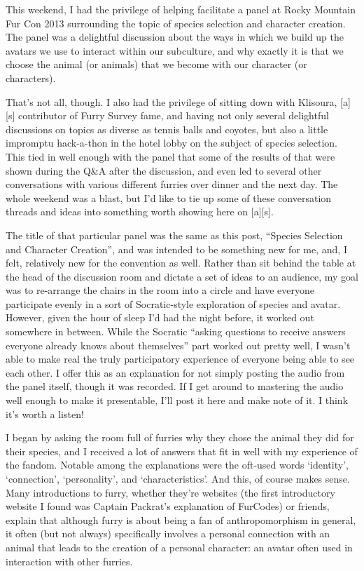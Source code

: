 
This weekend, I had the privilege of helping facilitate a panel at Rocky Mountain Fur Con 2013 surrounding the topic of species selection and character creation. The panel was a delightful discussion about the ways in which we build up the avatars we use to interact within our subculture, and why exactly it is that we choose the animal (or animals) that we become with our character (or characters).

That's not all, though. I also had the privilege of sitting down with Klisoura, [a][s] contributor of Furry Survey fame, and having not only several delightful discussions on topics as diverse as tennis balls and coyotes, but also a little impromptu hack-a-thon in the hotel lobby on the subject of species selection. This tied in well enough with the panel that some of the results of that were shown during the Q\&A after the discussion, and even led to several other conversations with various different furries over dinner and the next day. The whole weekend was a blast, but I'd like to tie up some of these conversation threads and ideas into something worth showing here on [a][s].

The title of that particular panel was the same as this post, ``Species Selection and Character Creation'', and was intended to be something new for me, and, I felt, relatively new for the convention as well. Rather than sit behind the table at the head of the discussion room and dictate a set of ideas to an audience, my goal was to re-arrange the chairs in the room into a circle and have everyone participate evenly in a sort of Socratic-style exploration of species and avatar. However, given the hour of sleep I'd had the night before, it worked out somewhere in between. While the Socratic ``asking questions to receive answers everyone already knows about themselves'' part worked out pretty well, I wasn't able to make real the truly participatory experience of everyone being able to see each other. I offer this as an explanation for not simply posting the audio from the panel itself, though it was recorded. If I get around to mastering the audio well enough to make it presentable, I'll post it here and make note of it. I think it's worth a listen!

I began by asking the room full of furries why they chose the animal they did for their species, and I received a lot of answers that fit in well with my experience of the fandom. Notable among the explanations were the oft-used words `identity', `connection', `personality', and `characteristics'. And this, of course makes sense. Many introductions to furry, whether they're websites (the first introductory website I found was Captain Packrat's explanation of FurCodes) or friends, explain that although furry is about being a fan of anthropomorphism in general, it often (but not always) specifically involves a personal connection with an animal that leads to the creation of a personal character: an avatar often used in interaction with other furries.

